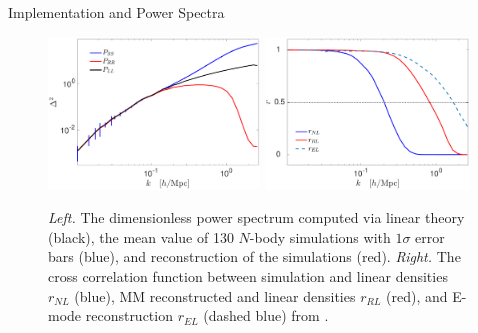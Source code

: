 \begin{section}{Implementation and Power Spectra}
  \begin{figure}
    \centering
    \includegraphics[width=0.5\textwidth]{fig2a.pdf}
    \includegraphics[width=0.485\textwidth]{fig2b.pdf}
    \caption{{\it Left.} The dimensionless power spectrum computed via
      linear theory (black), the mean value of 130 $N$-body
      simulations with $1\sigma$ error bars (blue), and reconstruction
      of the simulations (red).  {\it Right.} The cross correlation
      function between simulation and linear densities $r_{NL}$ (blue),
      MM reconstructed and linear densities $r_{RL}$ (red), and E-mode reconstruction $r_{EL}$ (dashed
      blue) from \citet{bib:Yu2016}.}
    \label{fig:cp}
  \end{figure}


\end{section}

